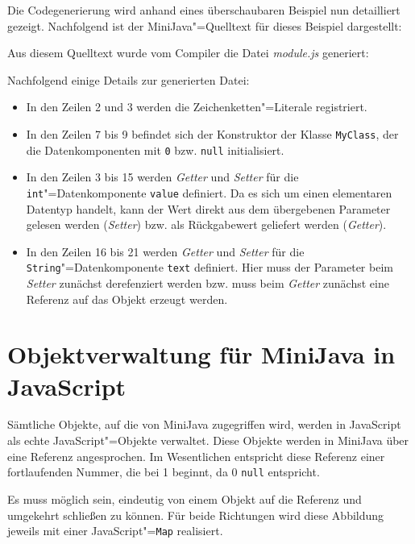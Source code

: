 \pagebreak
Die Codegenerierung wird anhand eines überschaubaren Beispiel nun detailliert gezeigt. Nachfolgend ist der MiniJava"=Quelltext für dieses Beispiel dargestellt:



Aus diesem Quelltext wurde vom Compiler die Datei \emph{module.js} generiert:



Nachfolgend einige Details zur generierten Datei:

\begin{itemize}
    \item In den Zeilen 2 und 3 werden die Zeichenketten"=Literale registriert. 
    \item In den Zeilen 7 bis 9 befindet sich der Konstruktor der Klasse \lstinline{MyClass}, der die Datenkomponenten mit \lstinline{0} bzw. \lstinline{null} initialisiert.
    \item In den Zeilen 3 bis 15 werden \emph{Getter} und \emph{Setter} für die \lstinline{int}"=Datenkomponente \lstinline{value} definiert. Da es sich um einen elementaren Datentyp handelt, kann der Wert direkt aus dem übergebenen Parameter gelesen werden (\emph{Setter}) bzw. als Rückgabewert geliefert werden (\emph{Getter}).
    \item In den Zeilen 16 bis 21 werden \emph{Getter} und \emph{Setter} für die \lstinline{String}"=Datenkomponente \lstinline{text} definiert. Hier muss der Parameter beim \emph{Setter} zunächst derefenziert werden bzw. muss beim \emph{Getter} zunächst eine Referenz auf das Objekt erzeugt werden.
\end{itemize}

\section{Objektverwaltung für MiniJava in JavaScript}

Sämtliche Objekte, auf die von MiniJava zugegriffen wird, werden in JavaScript als echte JavaScript"=Objekte verwaltet. Diese Objekte werden in MiniJava über eine Referenz angesprochen. Im Wesentlichen entspricht diese Referenz einer fortlaufenden Nummer, die bei 1 beginnt, da 0 \lstinline{null} entspricht.

Es muss möglich sein, eindeutig von einem Objekt auf die Referenz und umgekehrt schließen zu können. Für beide Richtungen wird diese Abbildung jeweils mit einer JavaScript"=\lstinline{Map} realisiert.

